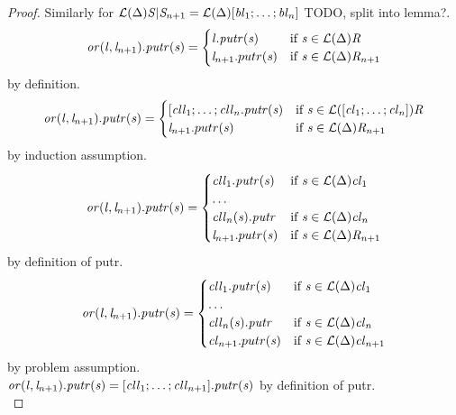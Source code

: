 \begin{lemma}
\begin{proof}
Similarly for
$\mathcal{L}(\Delta){\mathit{S}|\mathit{S}_{n+1}}
= \mathcal{L}(\Delta){[\mathit{bl}_1; \ldots ; \mathit{bl}_n]}$ TODO, split into lemma?.\\
\[
\mathit{or}(\mathit{l},\mathit{l}_{n+1}).\mathit{putr}(\mathit{s}) =
  \begin{cases}
    \mathit{l}.\mathit{putr}(\mathit{s})& \text{if } \mathit{s} \in \mathcal{L}(\Delta){\mathit{R}}\\
    \mathit{l}_{n+1}.putr(\mathit{s})& \text{if } \mathit{s} \in \mathcal{L}(\Delta){\mathit{R}_{n+1}}
  \end{cases}
\] by definition.\\
\[
\mathit{or}(\mathit{l},\mathit{l}_{n+1}).\mathit{putr}(\mathit{s}) =
  \begin{cases}
    [\mathit{cll}_1;\ldots;\mathit{cll}_n.\mathit{putr}(\mathit{s})& \text{if } \mathit{s} \in \mathcal{L}([\mathit{cl}_1 ; \ldots ; \mathit{cl}_n]){\mathit{R}}\\
    \mathit{l}_{n+1}.putr(\mathit{s})& \text{if } \mathit{s} \in \mathcal{L}(\Delta){\mathit{R}_{n+1}}
  \end{cases}
\] by induction assumption.\\
\[
\mathit{or}(\mathit{l},\mathit{l}_{n+1}).\mathit{putr}(\mathit{s}) =
  \begin{cases}
    \mathit{cll}_1.\mathit{putr}(\mathit{s})& \text{if } \mathit{s} \in \mathcal{L}(\Delta){\mathit{cl}_1}\\
\ldots \\
    \mathit{cll}_n(\mathit{s}).\mathit{putr}& \text{if } \mathit{s} \in \mathcal{L}(\Delta){\mathit{cl}_n}\\
    \mathit{l}_{n+1}.putr(\mathit{s})& \text{if } \mathit{s} \in \mathcal{L}(\Delta){\mathit{R}_{n+1}}
  \end{cases}
\] by definition of putr.\\
\[
\mathit{or}(\mathit{l},\mathit{l}_{n+1}).\mathit{putr}(\mathit{s}) =
  \begin{cases}
    \mathit{cll}_1.\mathit{putr}(\mathit{s})& \text{if } \mathit{s} \in \mathcal{L}(\Delta){\mathit{cl}_1}\\
\ldots \\
    \mathit{cll}_n(\mathit{s}).\mathit{putr}& \text{if } \mathit{s} \in \mathcal{L}(\Delta){\mathit{cl}_n}\\
    \mathit{cl}_{n+1}.putr(\mathit{s})& \text{if } \mathit{s} \in \mathcal{L}(\Delta){\mathit{cl}_{n+1}}
  \end{cases}
\] by problem assumption.\\
$\mathit{or}(\mathit{l},\mathit{l}_{n+1}).\mathit{putr}(\mathit{s}) =
[\mathit{cll}_1; \ldots ; \mathit{cll}_{n+1}].\mathit{putr}(\mathit{s})$ by definition of putr.\\
\end{proof}
\end{lemma}

